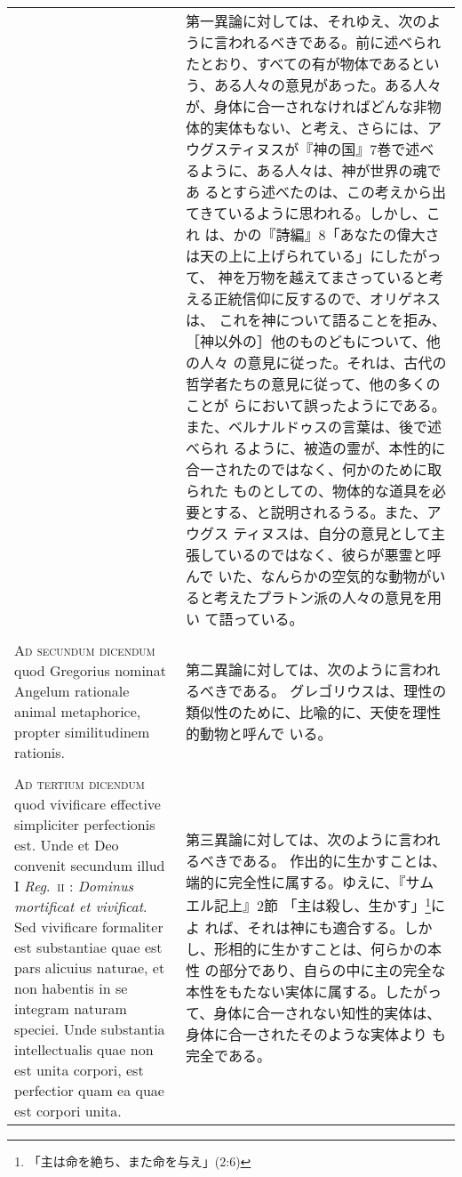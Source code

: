 \documentclass[10pt]{jsarticle} %
\begin{document}
\begin{longtable}{p{21em}p{21em}}
&

第一異論に対しては、それゆえ、次のように言われるべきである。前に述べられ
たとおり、すべての有が物体であるという、ある人々の意見があった。ある人々
が、身体に合一されなければどんな非物体的実体もない、と考え、さらには、ア
ウグスティヌスが『神の国』7巻で述べるように、ある人々は、神が世界の魂であ
るとすら述べたのは、この考えから出てきているように思われる。しかし、これ
は、かの『詩編』8「あなたの偉大さは天の上に上げられている」にしたがって、
神を万物を越えてまさっていると考える正統信仰に反するので、オリゲネスは、
これを神について語ることを拒み、［神以外の］他のものどもについて、他の人々
の意見に従った。それは、古代の哲学者たちの意見に従って、他の多くのことが
らにおいて誤ったようにである。また、ベルナルドゥスの言葉は、後で述べられ
るように、被造の霊が、本性的に合一されたのではなく、何かのために取られた
ものとしての、物体的な道具を必要とする、と説明されるうる。また、アウグス
 ティヌスは、自分の意見として主張しているのではなく、彼らが悪霊と呼んで
 いた、なんらかの空気的な動物がいると考えたプラトン派の人々の意見を用い
 て語っている。


\\\\


{\scshape Ad secundum dicendum} quod Gregorius nominat
Angelum rationale animal metaphorice, propter similitudinem rationis.


&
第二異論に対しては、次のように言われるべきである。
グレゴリウスは、理性の類似性のために、比喩的に、天使を理性的動物と呼んで
 いる。

\\\\


{\scshape Ad tertium dicendum} quod vivificare effective simpliciter
perfectionis est. Unde et Deo convenit secundum illud I {\itshape
Reg}.~{\scshape ii} : {\itshape Dominus mortificat et vivificat}. Sed
vivificare formaliter est substantiae quae est pars alicuius naturae, et
non habentis in se integram naturam speciei. Unde substantia
intellectualis quae non est unita corpori, est perfectior quam ea quae
est corpori unita.


&

第三異論に対しては、次のように言われるべきである。
作出的に生かすことは、端的に完全性に属する。ゆえに、『サムエル記上』2節
 「主は殺し、生かす」\footnote{「主は命を絶ち、また命を与え」(2:6)}によ
 れば、それは神にも適合する。しかし、形相的に生かすことは、何らかの本性
 の部分であり、自らの中に主の完全な本性をもたない実体に属する。したがっ
 て、身体に合一されない知性的実体は、身体に合一されたそのような実体より
 も完全である。


\end{longtable}
\newpage
\end{document}
